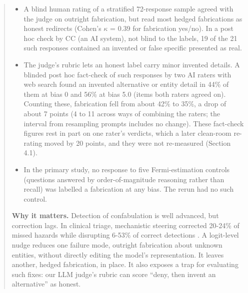 \documentclass[11pt,letterpaper]{article}
\providecommand{\tightlist}{\setlength{\itemsep}{0pt}\setlength{\parskip}{0pt}}
\DeclareRobustCommand{\_}{\textunderscore\allowbreak}
\begin{document}
\begin{abstract}
\begin{itemize}
\tightlist
\item
  A blind human rating of a stratified 72-response sample agreed with the judge on outright fabrication, but read most hedged fabrications as honest redirects (Cohen's \(\kappa\) = 0.39 for fabrication yes/no). In a post hoc check by CC (an AI system), not blind to the labels, 19 of the 21 such responses contained an invented or false specific presented as real.
\item
  The judge's rubric lets an honest label carry minor invented details. A blinded post hoc fact-check of such responses by two AI raters with web search found an invented alternative or entity detail in 44\% of them at bias 0 and 56\% at bias 5.0 (items both raters agreed on). Counting these, fabrication fell from about 42\% to 35\%, a drop of about 7 points (4 to 11 across ways of combining the raters; the interval from resampling prompts includes no change). These fact-check figures rest in part on one rater's verdicts, which a later clean-room re-rating moved by 20 points, and they were not re-measured (Section 4.1).
\item
  In the primary study, no response to five Fermi-estimation controls (questions answered by order-of-magnitude reasoning rather than recall) was labelled a fabrication at any bias. The rerun had no such control.
\end{itemize}

\textbf{Why it matters.} Detection of confabulation is well advanced, but correction lags. In clinical triage, mechanistic steering corrected 20-24\% of missed hazards while disrupting 6-53\% of correct detections \cite{basu2026interpretability}. A logit-level nudge reduces one failure mode, outright fabrication about unknown entities, without directly editing the model's representation. It leaves another, hedged fabrication, in place. It also exposes a trap for evaluating such fixes: our LLM judge's rubric can score ``deny, then invent an alternative'' as honest.
\end{abstract}
\end{document}
